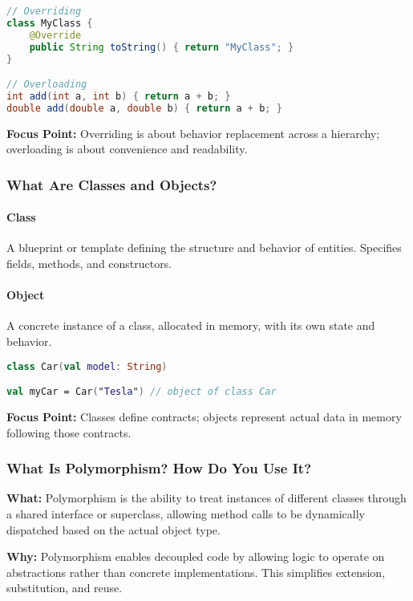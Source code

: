 \documentclass[a4paper,12pt]{article}
\begin{document}
\begin{lstlisting}[language=Java]
// Overriding
class MyClass {
    @Override
    public String toString() { return "MyClass"; }
}

// Overloading
int add(int a, int b) { return a + b; }
double add(double a, double b) { return a + b; }
\end{lstlisting}

\textbf{Focus Point:} Overriding is about behavior replacement across a hierarchy; overloading is about convenience and readability.

\subsubsection{What Are Classes and Objects?}

\paragraph{Class}
A blueprint or template defining the structure and behavior of entities. Specifies fields, methods, and constructors.

\paragraph{Object}
A concrete instance of a class, allocated in memory, with its own state and behavior.

\begin{lstlisting}[language=Kotlin]
class Car(val model: String)

val myCar = Car("Tesla") // object of class Car
\end{lstlisting}

\textbf{Focus Point:} Classes define contracts; objects represent actual data in memory following those contracts.


\subsubsection{What Is Polymorphism? How Do You Use It?}

\textbf{What:} Polymorphism is the ability to treat instances of different classes through a shared interface or superclass, allowing method calls to be dynamically dispatched based on the actual object type.

\textbf{Why:} Polymorphism enables decoupled code by allowing logic to operate on abstractions rather than concrete implementations. This simplifies extension, substitution, and reuse.
\end{document}
